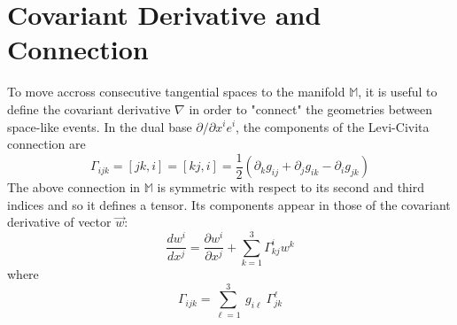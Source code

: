 \chapter{Covariant Derivative and Connection}
\label{apx:covariant}
{\color{purple}\titlerule[2.5pt]}
\vspace{4pc}%

To move accross consecutive tangential spaces to the manifold $\mathbb{M}$, it is useful to define the covariant derivative $\nabla$ in order to "connect" the geometries between space-like events. In the dual base $\partial / \partial x^i e^i$, the components of the Levi-Civita connection  are
\begin{equation}
\Gamma_{ijk} = \left[ jk, i \right] = \left[ kj, i \right] = \frac{1}{2} \left( \partial_k g_{ij} + \partial_j g_{ik} - \partial_i g_{jk} \right)
\end{equation}
The above connection in $\mathbb{M}$ is symmetric with respect to its second and third indices and so it defines a tensor. Its components appear in those of the covariant derivative of vector $\vec{w}$:
\begin{equation}
\label{eq:covariant}
\frac{d w^i}{d x^j} = \frac{\partial w^i}{\partial x^j} + \sum_{k=1}^{3} \Gamma^{i}_{kj} w^k
\end{equation} where
\begin{equation}
\Gamma_{ijk} = \sum_{\ell=1}^{3} ~g_{i\ell}~\Gamma^{\ell}_{jk}
\end{equation} \\

